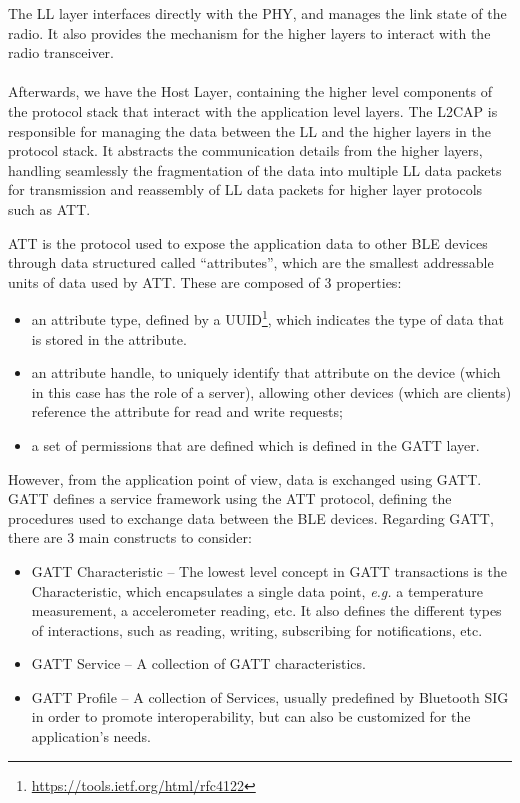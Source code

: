 The \acf{LL} layer interfaces directly with the \acs{PHY}, and manages the link state of the radio. It also provides the mechanism for the higher layers to interact with the radio transceiver. 

\paragraph{} Afterwards, we have the Host Layer, containing the higher level components of the protocol stack that interact with the application level layers. The \acs{L2CAP} is responsible for managing the data between the \acs{LL} and the higher layers in the protocol stack. It abstracts the communication details from the higher layers, handling seamlessly the fragmentation of the data into multiple \acs{LL} data packets for transmission and reassembly of \acs{LL} data packets for higher layer protocols such as \acf{ATT}.

\acs{ATT} is the protocol used to expose the application data to other \acs{BLE} devices through data structured called ``attributes'', which are the smallest addressable units of data used by \acs{ATT}. These are composed of 3 properties: 

\begin{itemize}
    \item an attribute type, defined by a \acf{UUID}\footnote{\url{https://tools.ietf.org/html/rfc4122}}, which indicates the type of data that is stored in the attribute.
    \item an attribute handle, to uniquely identify that attribute on the device (which in this case has the role of a server), allowing other devices (which are clients) reference the attribute for read and write requests;
    \item a set of permissions that are defined which is defined in the \acf{GATT} layer.
\end{itemize}

However, from the application point of view, data is exchanged using \acf{GATT}. \acs{GATT} defines a service framework using the \acs{ATT} protocol, defining the procedures used to exchange data between the \acs{BLE} devices. Regarding \acs{GATT}, there are 3 main constructs to consider:

\begin{itemize}
    \item \acs{GATT} Characteristic -- The lowest level concept in \acs{GATT} transactions is the Characteristic, which encapsulates a single data point, \textit{e.g.} a temperature measurement, a accelerometer reading, etc. It also defines the different types of interactions, such as reading, writing, subscribing for notifications, etc.
    \item \acs{GATT} Service -- A collection of \acs{GATT} characteristics.
    \item \acs{GATT} Profile -- A collection of Services, usually predefined by Bluetooth SIG in order to promote interoperability, but can also be customized for the application's needs.
\end{itemize}

